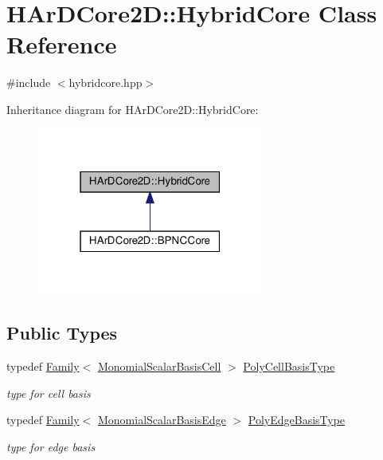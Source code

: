 \hypertarget{classHArDCore2D_1_1HybridCore}{}\section{H\+Ar\+D\+Core2D\+:\+:Hybrid\+Core Class Reference}
\label{classHArDCore2D_1_1HybridCore}


{\ttfamily \#include $<$hybridcore.\+hpp$>$}



Inheritance diagram for H\+Ar\+D\+Core2D\+:\+:Hybrid\+Core\+:\nopagebreak
\begin{figure}[H]
\begin{center}
\leavevmode
\includegraphics[width=211pt]{classHArDCore2D_1_1HybridCore__inherit__graph}
\end{center}
\end{figure}
\subsection*{Public Types}
\begin{DoxyCompactItemize}
\item 
\mbox{\label{classHArDCore2D_1_1HybridCore_a66e8eccfa5bfc2788b2aec903bd64d4a}} 
typedef \hyperlink{classHArDCore2D_1_1Family}{Family}$<$ \hyperlink{classHArDCore2D_1_1MonomialScalarBasisCell}{Monomial\+Scalar\+Basis\+Cell} $>$ \hyperlink{classHArDCore2D_1_1HybridCore_a66e8eccfa5bfc2788b2aec903bd64d4a}{Poly\+Cell\+Basis\+Type}
\begin{DoxyCompactList}\small\item\em type for cell basis \end{DoxyCompactList}\item 
\mbox{\label{classHArDCore2D_1_1HybridCore_a76550d672e82b1b9e49ea90054b8cc6d}} 
typedef \hyperlink{classHArDCore2D_1_1Family}{Family}$<$ \hyperlink{classHArDCore2D_1_1MonomialScalarBasisEdge}{Monomial\+Scalar\+Basis\+Edge} $>$ \hyperlink{classHArDCore2D_1_1HybridCore_a76550d672e82b1b9e49ea90054b8cc6d}{Poly\+Edge\+Basis\+Type}
\begin{DoxyCompactList}\small\item\em type for edge basis \end{DoxyCompactList}\end{DoxyCompactItemize}
